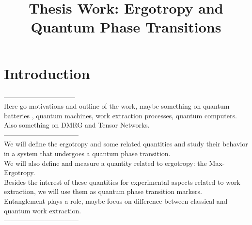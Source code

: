 \documentclass[12pt,a4paper]{book}
\title{Thesis Work: Ergotropy and Quantum Phase Transitions }
\author{}
\theoremstyle{definition}
\begin{document}
   \maketitle
\tableofcontents{}

   
\chapter{Introduction}
--------------------------------\\
Here go motivations and outline of the work, maybe something on quantum batteries  \cite{PhysRevE.87.042123} \cite{PhysRevB.99.205437} \cite{deffner2019quantum}, quantum machines, work extraction processes, quantum computers.\\
Also something on DMRG and Tensor Networks.\\
---------------------------------\\
We will define the ergotropy and some related quantities and study their behavior in a system that undergoes a quantum phase transition.\\
We will also define and measure a quantity related to ergotropy: the Max-Ergotropy.\\
Besides the interest of these quantities for experimental aspects related to work extraction, we will use them as quantum phase transition markers.\\
Entanglement plays a role, maybe focus on difference between classical and quantum work extraction.\\


---------------------------------\\
\end{document}

